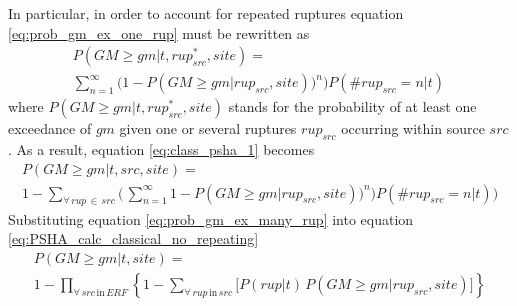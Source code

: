In particular, in order to account for repeated ruptures equation 
\ref{eq:prob_gm_ex_one_rup} must be rewritten as 
\begin{multline}
P(GM \geq gm|t,rup_{src}^{*},site) = \\
	\sum\limits_{n=1}^{\infty}
	\bigl(1 - P(GM\geq gm|rup_{src},site))^{n}\bigr)
	P(\#rup_{src}=n|t)\,
\label{eq:prob_gm_ex_many_rup}
\end{multline}
where $P(GM \geq gm|t,rup_{src}^*,site)$ stands for the 
probability of at least one exceedance of $gm$ given one or several 
ruptures $rup_{src}$ occurring within source $src$.
% 
As a result, equation \ref{eq:class_psha_1} becomes 
\begin{multline}
P(GM \geq gm|t,src,site) = \\
1 - \sum_{\forall\,rup\,\in\,src}^{} 
	\biggl(\,
	\sum\limits_{n=1}^{\infty}
	1 - P(GM\geq gm|rup_{src},site))^{n}\bigr)
	P(\#rup_{src}=n|t)
	\biggr)
\end{multline}
%
Substituting equation \ref{eq:prob_gm_ex_many_rup} into equation 
\ref{eq:PSHA_calc_classical_no_repeating}
\begin{multline}
P(GM \geq gm|t,site) = \\
	1-\prod\limits_{\forall\,src\,\text{in}\,ERF}^{}
	\left\{
		1-\sum\limits_{\forall\,rup\,\text{in}\,src}^{} 
			\biggl[ P(rup|t)\,P(GM\geq gm|rup_{src},site)
			\biggr]
	\right\}
\end{multline}
